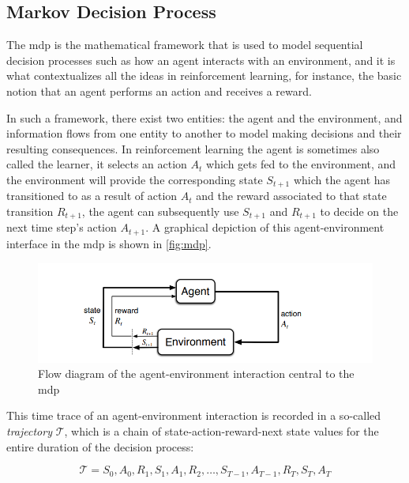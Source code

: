 \documentclass[../report.tex]{subfiles}
\begin{document}
\subsection{Markov Decision Process}

The \ac{mdp} is the mathematical framework that is used to model sequential decision processes such as how an agent interacts with an environment, and it is what contextualizes all the ideas in reinforcement learning, for instance, the basic notion that an agent performs an action and receives a reward.

In such a framework, there exist two entities: the agent and the environment, and information flows from one entity to another to model making decisions and their resulting consequences. In reinforcement learning the agent is sometimes also called the learner, it selects an action $A_t$ which gets fed to the environment, and the environment will provide the corresponding state $S_{t+1}$ which the agent has transitioned to as a result of action $A_t$ and the reward associated to that state transition $R_{t+1}$, the agent can subsequently use $S_{t+1}$ and $R_{t+1}$ to decide on the next time step's action $A_{t+1}$. A graphical depiction of this agent-environment interface in the \ac{mdp} is shown in \autoref{fig:mdp}.

\begin{figure}[H]
    \centering
    \includegraphics[width=\textwidth]{figures/01/mdp.png}
    \caption{Flow diagram of the agent-environment interaction central to the \ac{mdp}}
    \label{fig:mdp}
\end{figure}

This time trace of an agent-environment interaction is recorded in a so-called \textit{trajectory} $\mathcal{T}$, which is a chain of state-action-reward-next state values for the entire duration of the decision process:

\begin{equation} \label{eq:trajectory}
    \mathcal{T} = S_{0}, A_{0}, R_{1}, S_{1}, A_{1}, R_{2}, \dots, S_{T-1}, A_{T-1}, R_{T}, S_{T}, A_{T}
\end{equation}
\end{document}
